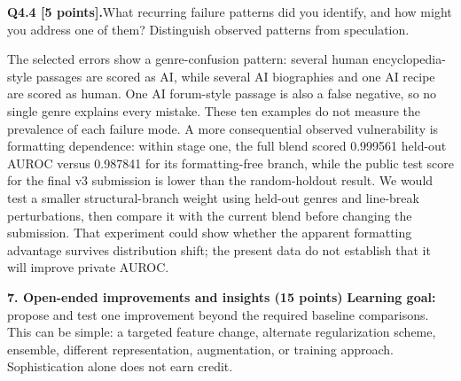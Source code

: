 \documentclass[11pt,letterpaper]{article}
\newcommand{\question}[2]{\par\vspace{6pt}\noindent\textbf{#1}\quad #2\par}
\begin{document}
\question{Q4.4 [5 points].}{What recurring failure patterns did you identify, and how might you address one of them? Distinguish observed patterns from speculation.}
The selected errors show a genre-confusion pattern: several human encyclopedia-style passages are scored as AI, while several AI biographies and one AI recipe are scored as human. One AI forum-style passage is also a false negative, so no single genre explains every mistake. These ten examples do not measure the prevalence of each failure mode. A more consequential observed vulnerability is formatting dependence: within stage one, the full blend scored 0.999561 held-out AUROC versus 0.987841 for its formatting-free branch, while the public test score for the final v3 submission is lower than the random-holdout result. We would test a smaller structural-branch weight using held-out genres and line-break perturbations, then compare it with the current blend before changing the submission. That experiment could show whether the apparent formatting advantage survives distribution shift; the present data do not establish that it will improve private AUROC.

\newpage

{\large\textbf{7. Open-ended improvements and insights (15 points)}}
\textbf{Learning goal:} propose and test one improvement beyond the required baseline comparisons. This can be simple: a targeted feature change, alternate regularization scheme, ensemble, different representation, augmentation, or training approach. Sophistication alone does not earn credit.
\end{document}
